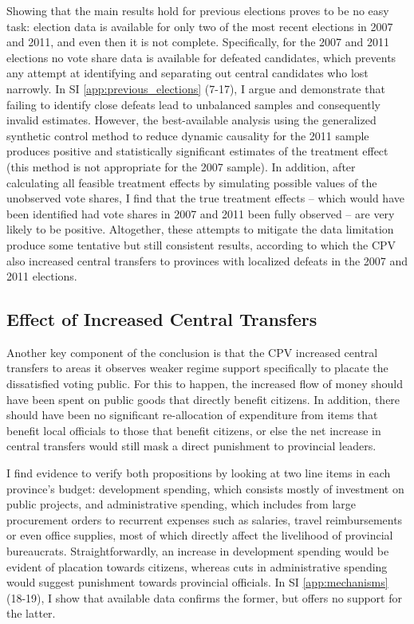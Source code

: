 \documentclass[12pt]{article}
\newcommand{\1}{\mathbbm{1}}
\begin{document}
Showing that the main results hold for previous elections proves to be no easy task: election data is available for only two of the most recent elections in 2007 and 2011, and even then it is not complete. Specifically, for the 2007 and 2011 elections no vote share data is available for defeated candidates, which prevents any attempt at identifying and separating out central candidates who lost narrowly. In SI \ref{app:previous_elections} (7-17), I argue and demonstrate that failing to identify close defeats lead to unbalanced samples and consequently invalid estimates. However, the best-available analysis using the generalized synthetic control method to reduce dynamic causality for the 2011 sample produces positive and statistically significant estimates of the treatment effect (this method is not appropriate for the 2007 sample). In addition, after calculating all feasible treatment effects by simulating possible values of the unobserved vote shares, I find that the true treatment effects -- which would have been identified had vote shares in 2007 and 2011 been fully observed -- are very likely to be positive. Altogether, these attempts to mitigate the data limitation produce some tentative but still consistent results, according to which the CPV also increased central transfers to provinces with localized defeats in the 2007 and 2011 elections.

\subsection{Effect of Increased Central Transfers}

Another key component of the conclusion is that the CPV increased central transfers to areas it observes weaker regime support specifically to placate the dissatisfied voting public. For this to happen, the increased flow of money should have been spent on public goods that directly benefit citizens. In addition, there should have been no significant re-allocation of expenditure from items that benefit local officials to those that benefit citizens, or else the net increase in central transfers would still mask a direct punishment to provincial leaders. 

I find evidence to verify both propositions by looking at two line items in each province's budget: development spending, which consists mostly of investment on public projects, and administrative spending, which includes from large procurement orders to recurrent expenses such as salaries, travel reimbursements or even office supplies, most of which directly affect the livelihood of provincial bureaucrats. Straightforwardly, an increase in development spending would be evident of placation towards citizens, whereas cuts in administrative spending would suggest punishment towards provincial officials. In SI \ref{app:mechanisms} (18-19), I show that available data confirms the former, but offers no support for the latter.
\end{document}
